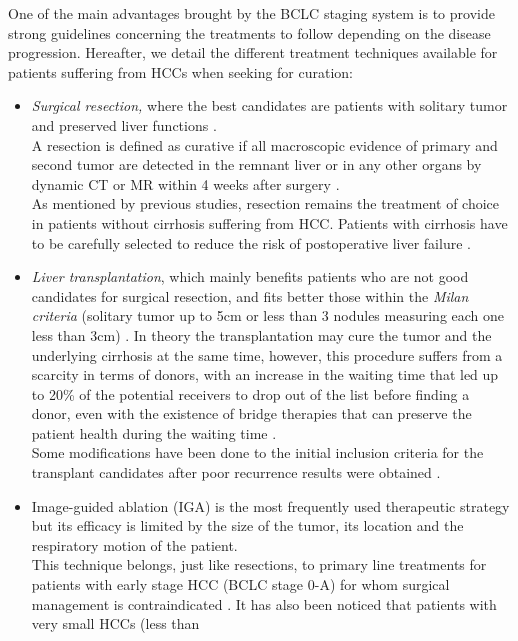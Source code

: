 One of the main advantages brought by the BCLC staging system is
to provide strong guidelines concerning the treatments to follow
depending on the disease progression.
Hereafter, we detail the different treatment techniques available for
patients suffering from HCCs when seeking for curation:
\begin{itemize}
\item \emph{Surgical resection,} where the best candidates are patients with
  solitary tumor and preserved liver functions \cite{Forner2018}.\\
  A resection is defined as curative if all macroscopic evidence of
  primary and second tumor are detected in the remnant liver or in any
  other organs by dynamic CT or MR within 4 weeks after surgery
  \cite{Yang2012}.\\
  As mentioned by previous studies, resection remains the treatment of
  choice in patients without cirrhosis suffering from HCC. Patients with
  cirrhosis have to be carefully selected to reduce the risk of
  postoperative liver failure \cite{Bruix2011,Llovet2012,Verslype2012}.
\item
  \emph{Liver transplantation}, which mainly benefits patients who are
  not good candidates for surgical resection, and fits better those
  within the \emph{Milan criteria} (solitary tumor up to 5cm or less
  than 3 nodules measuring each one less than 3cm) \cite{Llovet2012,Mazzaferro2011}. In theory the transplantation may cure the
  tumor and the underlying cirrhosis at the same time, however, this
  procedure suffers from a scarcity in terms of donors, with an increase
  in the waiting time that led up to 20\% of the potential receivers to
  drop out of the list before finding a donor, even with the existence
  of bridge therapies that can preserve the patient health during the
  waiting time \cite{Llovet1999}.\\
  Some modifications have been done to the initial inclusion criteria
  for the transplant candidates after poor recurrence results were
  obtained \cite{Llovet2012}.
\item Image-guided ablation (IGA) is the most frequently used
  therapeutic strategy but its efficacy is limited by the size of the
  tumor, its location and the respiratory motion of the patient.\\
  This technique belongs, just like resections, to primary line
  treatments for patients with early stage HCC (BCLC stage 0-A)
  for whom surgical management is contraindicated \cite{Bruix2011,Heimbach2018}. It has
  also been noticed that patients with very small HCCs (less than

\end{itemize}

